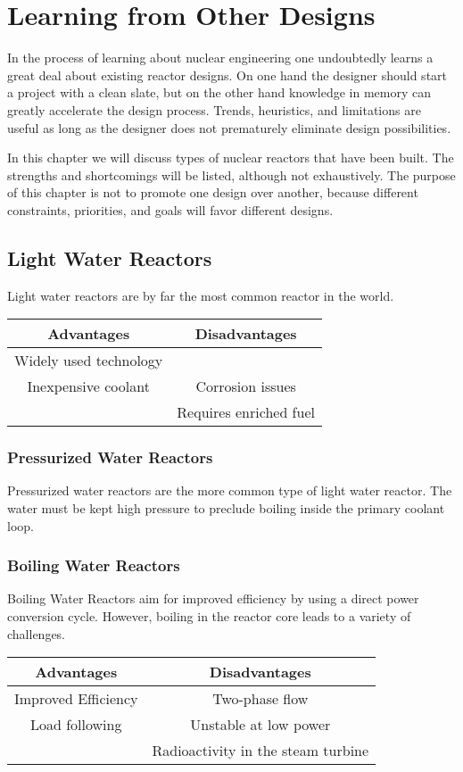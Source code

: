 \chapter{Learning from Other Designs}
In the process of learning about nuclear engineering one undoubtedly learns a great deal about existing reactor designs. On one hand the designer should start a project with a clean slate, but on the other hand knowledge in memory can greatly accelerate the design process.
Trends, heuristics, and limitations are useful as long as the designer does not prematurely eliminate design possibilities.

In this chapter we will discuss types of nuclear reactors that have been built. The strengths and shortcomings will be listed, although not exhaustively. 
The purpose of this chapter is not to promote one design over another, because different constraints, priorities, and goals will favor different designs.

\section{Light Water Reactors}
Light water reactors are by far the most common reactor in the world. 
\begin{table}[!h]
\begin{tabular}{c|c}
  Advantages & Disadvantages \\
  \hline
  Widely used technology &  \\
  Inexpensive coolant & Corrosion issues \\
   & Requires enriched fuel \\
\end{tabular}
\end{table}

\subsection{Pressurized Water Reactors}
Pressurized water reactors are the more common type of light water reactor. The water must be kept high pressure to preclude boiling inside the primary coolant loop.

\subsection{Boiling Water Reactors}
Boiling Water Reactors aim for improved efficiency by using a direct power conversion cycle. However, boiling in the reactor core leads to a variety of challenges. 
\begin{table}[!h]
\begin{tabular}{c|c}
  Advantages & Disadvantages \\
  \hline
  Improved Efficiency & Two-phase flow \\
  Load following & Unstable at low power\\
   & Radioactivity in the steam turbine\\
\end{tabular}
\end{table}


